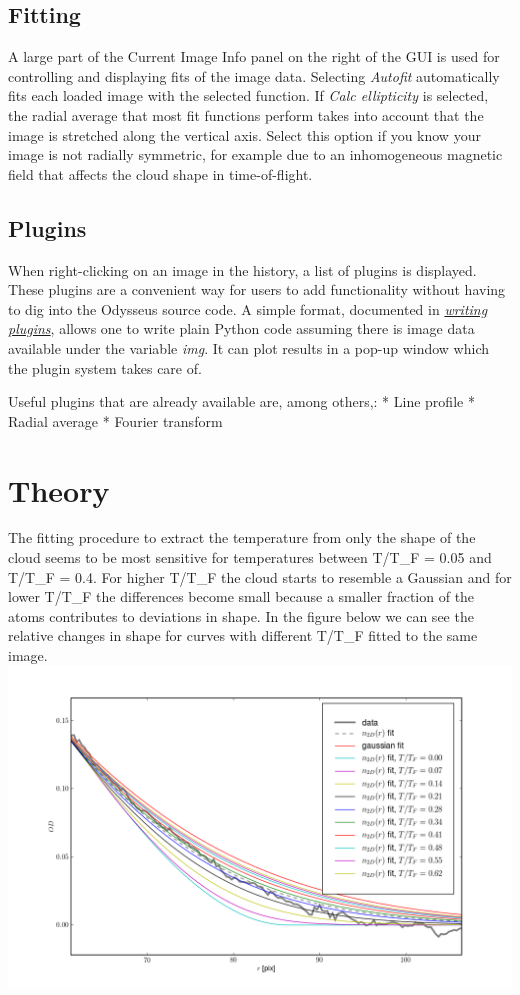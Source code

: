 \documentclass[letterpaper,10pt,english]{manual}
\begin{document}
\subsection{Fitting}

A large part of the Current Image Info panel on the right of the GUI is used for controlling and displaying fits of the image data. Selecting \emph{Autofit} automatically fits each loaded image with the selected function. If \emph{Calc ellipticity} is selected, the radial average that most fit functions perform takes into account that the image is stretched along the vertical axis. Select this option if you know your image is not radially symmetric, for example due to an inhomogeneous magnetic field that affects the cloud shape in time-of-flight.


\subsection{Plugins}

When right-clicking on an image in the history, a list of plugins is displayed. These plugins are a convenient way for users to add functionality without having to dig into the Odysseus source code. A simple format, documented in \hyperlink{writing-plugins}{\emph{writing plugins}}, allows one to write plain Python code assuming there is image data available under the variable \emph{img}. It can plot results in a pop-up window which the plugin system takes care of.

Useful plugins that are already available are, among others,:
* Line profile
* Radial average
* Fourier transform

\resetcurrentobjects
\hypertarget{--doc-theory}{}

\section{Theory}

The fitting procedure to extract the temperature from only the shape of the cloud seems to be most sensitive for temperatures between T/T\_F = 0.05 and T/T\_F = 0.4. For higher T/T\_F the cloud starts to resemble a Gaussian and for lower T/T\_F the differences become small because a smaller fraction of the atoms contributes to deviations in shape. In the figure below we can see the relative changes in shape for curves with different T/T\_F fitted to the same image.
\includegraphics[width=500pt]{fit_several_temperatures.png}
\end{document}
